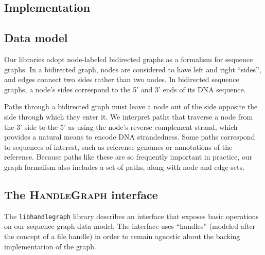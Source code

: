 \documentclass{bioinfo}
\begin{document}
\begin{methods}

\section{Implementation}

\subsection{Data model}

Our libraries adopt node-labeled bidirected graphs as a formalism for sequence graphs.
In a bidirected graph, nodes are considered to have left and right ``sides'', and edges connect two sides rather than two nodes.
In bidirected sequence graphs, a node's sides correspond to the 5' and 3' ends of its DNA sequence. 

Paths through a bidirected graph must leave a node out of the side opposite the side through which they enter it.
We interpret paths that traverse a node from the 3' side to the 5' as using the node's reverse complement strand, which provides a natural means to encode DNA strandedness.
Some paths correspond to sequences of interest, such as reference genomes or annotations of the reference.
Because paths like these are so frequently important in practice, our graph formalism also includes a set of paths, along with node and edge sets.

\subsection{The \textsc{HandleGraph} interface}

The \texttt{libhandlegraph} library describes an interface that exposes basic operations on our sequence graph data model.
The interface uses ``handles'' (modeled after the concept of a file handle) in order to remain agnostic about the backing implementation of the graph.


\end{methods}
\end{document}
